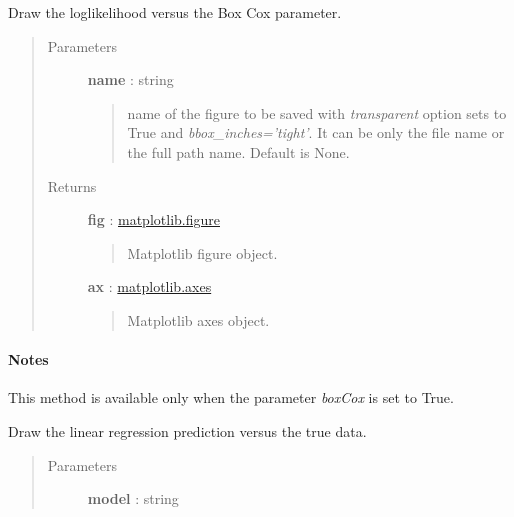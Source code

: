 \documentclass[letterpaper,10pt,english]{sphinxmanual}
\begin{document}
\begin{fulllineitems}

\begin{fulllineitems}
\label{_generated/otpod.UnivariateLinearModelAnalysis:otpod.UnivariateLinearModelAnalysis.drawBoxCoxLikelihood}
Draw the loglikelihood versus the Box Cox parameter.
\begin{quote}\begin{description}
\item[{Parameters}] \leavevmode
\textbf{name} : string
\begin{quote}

name of the figure to be saved with \emph{transparent} option sets to True
and \emph{bbox\_inches='tight'}. It can be only the file name or the 
full path name. Default is None.
\end{quote}

\item[{Returns}] \leavevmode
\textbf{fig} : \href{http://matplotlib.org/api/figure\_api.html}{matplotlib.figure}
\begin{quote}

Matplotlib figure object.
\end{quote}

\textbf{ax} : \href{http://matplotlib.org/api/axes\_api.html}{matplotlib.axes}
\begin{quote}

Matplotlib axes object.
\end{quote}

\end{description}\end{quote}
\paragraph{Notes}

This method is available only when the parameter \emph{boxCox} is set to True.

\end{fulllineitems}


\begin{fulllineitems}
\label{_generated/otpod.UnivariateLinearModelAnalysis:otpod.UnivariateLinearModelAnalysis.drawLinearModel}
Draw the linear regression prediction versus the true data.
\begin{quote}\begin{description}
\item[{Parameters}] \leavevmode
\textbf{model} : string
\begin{quote}


\end{quote}
\end{description}
\end{quote}
\end{fulllineitems}
\end{fulllineitems}
\end{document}

